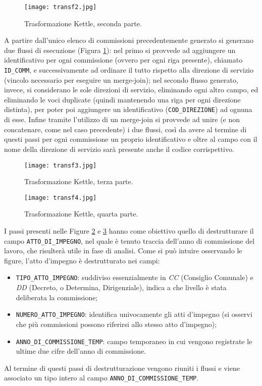 		\begin{figure}[h!]
			\centering
				\texttt{[image: transf2.jpg]}
			\caption{Trasformazione Kettle, seconda parte.}
			\label{fig:transf2}
		\end{figure}
		
		A partire dall'unico elenco di commissioni precedentemente generato si generano due flussi di esecuzione (Figura \ref{fig:transf2}): nel primo si provvede ad aggiungere un identificativo per ogni commissione (ovvero per ogni riga presente), chiamato \texttt{ID\_COMM}, e successivamente ad ordinare il tutto rispetto alla direzione di servizio (vincolo necessario per eseguire un merge-join); nel secondo flusso generato, invece, si considerano le sole direzioni di servizio, eliminando ogni altro campo, ed eliminando le voci duplicate (quindi mantenendo una riga per ogni direzione distinta), per poter poi aggiungere un identificativo (\texttt{COD\_DIREZIONE}) ad ognuna di esse. Infine tramite l'utilizzo di un merge-join si provvede ad unire (e non concatenare, come nel caso precedente) i due flussi, così da avere al termine di questi passi per ogni commissione un proprio identificativo e oltre al campo con il nome della direzione di servizio sarà presente anche il codice corrispettivo.\\
		
		\begin{figure}[h!]
			\centering
				\texttt{[image: transf3.jpg]}
			\caption{Trasformazione Kettle, terza parte.}
			\label{fig:transf3}
		\end{figure}
		
		\begin{figure}[h!]
			\centering
				\texttt{[image: transf4.jpg]}
			\caption{Trasformazione Kettle, quarta parte.}
			\label{fig:transf4}
		\end{figure}
		
		I passi presenti nelle Figure \ref{fig:transf3} e \ref{fig:transf4} hanno come obiettivo quello di destrutturare il campo \texttt{ATTO\_DI\_IMPEGNO}, nel quale è tenuto traccia dell'anno di commissione del lavoro, che risulterà utile in fase di analisi. Come si può intuire osservando le figure, l'atto d'impegno è destrutturato nei campi:
		\begin{itemize}
			\item \texttt{TIPO\_ATTO\_IMPEGNO}: suddiviso essenzialmente in \textit{CC} (Consiglio Comunale) e \textit{DD} (Decreto, o Determina, Dirigenziale), indica a che livello è stata deliberata la commissione;
			\item \texttt{NUMERO\_ATTO\_IMPEGNO}: identifica univocamente gli atti d'impegno (si osservi che più commissioni possono riferirsi allo stesso atto d'impegno);
			\item \texttt{ANNO\_DI\_COMMISSIONE\_TEMP}: campo temporaneo in cui vengono registrate le ultime due cifre dell'anno di commissione.
		\end{itemize}
		Al termine di questi passi di destrutturazione vengono riuniti i flussi e viene associato un tipo intero al campo \texttt{ANNO\_DI\_COMMISSIONE\_TEMP}.\\
		
